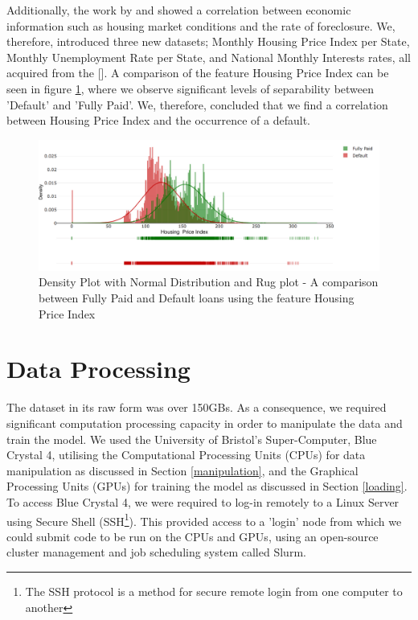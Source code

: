             Additionally, the work by \cite{default_risk_2011} and \cite{mortgage_risk} showed a correlation between economic information such as housing market conditions and the rate of foreclosure.  We, therefore, introduced three new datasets; Monthly Housing Price Index per State, Monthly Unemployment Rate per State, and National Monthly Interests rates, all acquired from the \citeauthor{labor_stats} []. A comparison of the feature Housing Price Index can be seen in figure \ref{fig:housing_price_index}, where we observe significant levels of separability between 'Default' and 'Fully Paid'. We, therefore, concluded that we find a correlation between Housing Price Index and the occurrence of a default. 
                
            \begin{figure}[H]
                \centering
                \hspace*{-0.5cm}\includegraphics[width=1.1\textwidth]{Images/housing_price_index_dist.png}
                \caption{Density Plot with Normal Distribution and Rug plot - A comparison between Fully Paid and Default loans using the feature Housing Price Index}
                \label{fig:housing_price_index}
            \end{figure}
                
        
        
        
    
    \clearpage
    
    \section{Data Processing}
        The dataset in its raw form was over 150GBs. As a consequence, we required significant computation processing capacity in order to manipulate the data and train the model. We used the University of Bristol's Super-Computer, Blue Crystal 4, utilising the Computational Processing Units (CPUs) for data manipulation as discussed in Section \ref{manipulation}, and the Graphical Processing Units (GPUs) for training the model as discussed in Section \ref{loading}. To access Blue Crystal 4, we were required to log-in remotely to a Linux Server using Secure Shell (SSH\footnote{The SSH protocol is a method for secure remote login from one computer to another}). This provided access to a 'login' node from which we could submit code to be run on the CPUs and GPUs, using an open-source cluster management and job scheduling system called Slurm. 
        
